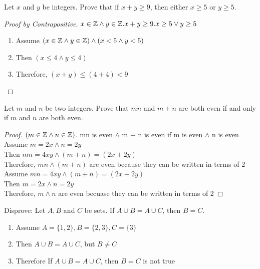 \documentclass{homework}
\begin{document}
\question Let $x$ and $y$ be integers. Prove that if $x + y \geq 9$, then either $x \geq 5$ or $y \geq 5$.
\begin{sol}
	\begin{proof}[Proof by Contrapositive] $x \in \mathbb{Z} \land y \in \mathbb{Z}. x + y \geq 9. x \geq 5 \lor y \geq 5$
		\begin{enumerate}
			\item Assume $(x \in \mathbb{Z} \land y \in \mathbb{Z}) \land (x < 5 \land y < 5)$
			\item Then $(x \leq 4 \land y \leq 4)$
			\item Therefore, $(x + y) \leq (4 + 4) < 9$
		\end{enumerate}
	\end{proof}
\end{sol}

\question Let $m$ and $n$ be two integers. Prove that $mn$ and $m + n$ are both even if and only if $m$ and $n$ are both even.

\begin{sol}
	\begin{proof} $(m \in \mathbb{Z} \land n \in \mathbb{Z})$. mn is even $\land$ m + n is even if m is even $\land$ n is even \\
		Assume $m = 2x \land n = 2y$ \\
		Then $mn = 4xy \land (m + n) = (2x + 2y)$ \\
		Therefore, $mn \land (m + n)$ are even because they can be written in terms of 2\\
\smallbreak
		Assume $mn = 4xy \land (m + n) = (2x + 2y)$ \\
		Then $m = 2x \land n = 2y$\\
		Therefore, $m \land n$ are even becuase they can be written in terms of 2
	\end{proof}
\end{sol}

\question Disprove: Let $A, B$ and $C$ be sets. If $A \cup B = A \cup C$, then $B = C$.

\begin{sol}
	\begin{enumerate}
		\item Assume $A = \{1, 2\}, B = \{2, 3\}, C = \{3\}$
		\item Then $A \cup B = A \cup C$, but $B \neq C$
		\item Therefore If $A \cup B = A \cup C$, then $B = C$ is not true
	\end{enumerate}
\end{sol}
\end{document}
